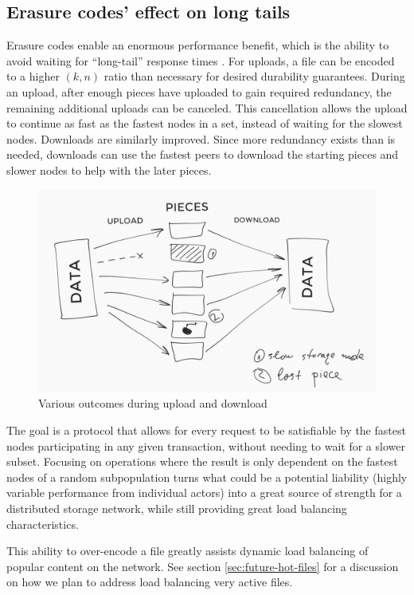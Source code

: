 \documentclass[8pt,fleqn,openany]{book}
\begin{document}
\subsection{Erasure codes' effect on long tails}

Erasure codes enable an enormous performance benefit, which is the ability to
avoid waiting for ``long-tail'' response times \cite{tail-at-scale}. For uploads,
a file can be encoded to a higher $(k, n)$ ratio than necessary for desired
durability guarantees.
During an upload, after enough pieces have uploaded to gain required
redundancy, the remaining additional uploads can be canceled. This cancellation allows the
upload to continue as fast as the fastest nodes in a set, instead of waiting
for the slowest nodes.
Downloads are similarly improved. Since more redundancy exists
than is needed, downloads can use the fastest peers to download the starting pieces and slower
nodes to help with the later pieces.

\begin{figure}
\centering
\includegraphics[width=\textwidth]{diagram-drafts/redundancy.png}
\caption{Various outcomes during upload and download}
\end{figure}

The goal is a protocol that allows for every request to be satisfiable by the
fastest nodes participating in any given transaction, without needing to wait
for a slower subset.
Focusing on operations where the result is only dependent on the fastest
nodes of a random subpopulation turns what could be a potential liability
(highly variable performance from individual actors) into a great source of
strength for a distributed storage network, while still providing great load
balancing characteristics.

This ability to over-encode a file greatly assists dynamic load balancing of
popular content on the network. See section \ref{sec:future-hot-files} for
a discussion on how we plan to address load balancing very active files.
\end{document}
